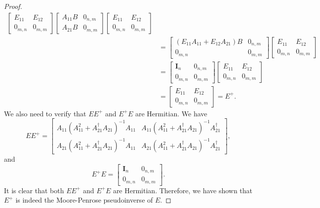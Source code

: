 \documentclass{article}
\theoremstyle{plain}
\theoremstyle{definition}
\theoremstyle{remark}
\theoremstyle{remark}
\begin{document}
\begin{proof}
\begin{align}
\begin{bmatrix}
        E_{11} & E_{12} \\ 
        0_{m,n} & 0_{m,m} 
      \end{bmatrix} 
      \begin{bmatrix} 
        A_{11} B & 0_{n,m} \\ 
        A_{21} B & 0_{m,m} 
      \end{bmatrix} 
      \begin{bmatrix} 
        E_{11} & E_{12} \\ 
        0_{m,n} & 0_{m,m} 
      \end{bmatrix} \nonumber \\
      &= 
      \begin{bmatrix} 
        (E_{11}A_{11}+ E_{12}A_{21})B & 0_{n,m} \\
        0_{m,n} & 0_{m,m} 
      \end{bmatrix} 
      \begin{bmatrix} 
        E_{11} & E_{12} \\ 
        0_{m,n} & 0_{m,m} 
      \end{bmatrix} \nonumber \\
      &= 
      \begin{bmatrix} 
        \mathbf{I}_{n} & 0_{n,m} \\ 
        0_{m,n} & 0_{m,m} 
      \end{bmatrix} 
      \begin{bmatrix} 
        E_{11} & E_{12} \\ 
        0_{m,n} & 0_{m,m} 
      \end{bmatrix} \nonumber \\
      &= 
      \begin{bmatrix}
         E_{11} & E_{12} \\ 
         0_{m,n} & 0_{m,m} 
      \end{bmatrix} = E^{+}.
    \end{align}
    We also need to verify that $EE^{+}$ and $E^{+}E$ are Hermitian. We have
    \begin{equation}
      EE^{+} = \begin{bmatrix} A_{11} \left(A_{11}^2 + A_{21}^{\dagger}A_{21}\right)^{-1} A_{11} & A_{11} \left(A_{11}^2 + A_{21}^{\dagger}A_{21}\right)^{-1} A_{21}^{\dagger}  \\ A_{21} \left(A_{11}^2 + A_{21}^{\dagger}A_{21}\right)^{-1} A_{11}  & A_{21}\left(A_{11}^2 + A_{21}^{\dagger}A_{21}\right)^{-1} A_{21}^{\dagger}  \end{bmatrix},
    \end{equation}
    and 
    \begin{equation}
      E^{+} E = \begin{bmatrix} \mathbf{I}_{n} & 0_{n,m} \\ 0_{m,n} & 0_{m,m} \end{bmatrix}.
    \end{equation}
    It is clear that both $EE^{+}$ and $E^{+}E$ are Hermitian. Therefore, we have shown that $E^{+}$ is indeed the Moore-Penrose pseudoinverse of $E$.
    \end{proof}
\end{document}
